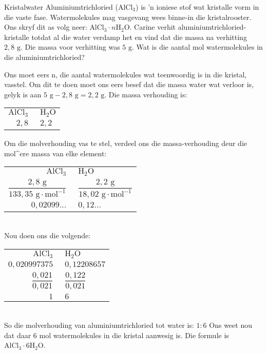     \noindent
\par
            \label{m38712*eid672431}
      \noindent
      \begin{wex}{Kristalwater}{
\label{m38712*pid47982}
\label{m38712*id64827}Aluminiumtrichloried (${\text{AlCl}}_{3}$) is 'n ioniese stof wat kristalle vorm in die vaste fase. Watermolekules mag vasgevang wees binne-in die kristalrooster. Ons skryf dit as volg neer: ${\text{AlCl}}_{3} \cdot n{\text{H}}_{2}\text{O}$. Carine verhit  aluminiumtrichloried-kristalle totdat al die water verdamp het en vind dat die massa na verhitting $2,8 \text{ g}$. Die massa voor verhitting was $5 \text{ g}$. Wat is die aantal mol watermolekules in die aluminiumtrichloried?
}
{
Ons moet eers n, die aantal watermolekules wat teenwoordig is in die kristal, vasstel. Om dit te doen moet ons eers besef dat die massa water wat verloor is, gelyk is aan $5 \text{ g} - 2,8 \text{ g} = 2,2 \text{ g}$.
  \label{m38712*id3892}Die massa verhouding is:\\
\begin{tabular}{r@{:}l}
 $\text{AlCl}_3~$ & $~\text{H}_{2}\text{O}$ \\
   $2,8~$ & $~2,2$ \\
\end{tabular}
Om die molverhouding vas te stel, verdeel ons die massa-verhouding deur die mol^{e}re massa van elke element:\\
\begin{tabular}{r@{:}l}
 $\text{AlCl}_3~$ & $~\text{H}_{2}\text{O}$ \\
    $\dfrac{2,8 \text{ g}}{133,35 \text{ g} \cdot \text{mol}^{-1}}~$ & $~\dfrac{2,2 \text{ g}}{18,02 \text{ g} \cdot \text{mol}^{-1}}$ \\
$0,02099...~$ & $~0,12...$  \\
\end{tabular}\\
Nou doen ons die volgende: \\
\begin{tabular}{r@{:}l}
 $\text{AlCl}_3~$ & $~\text{H}_{2}\text{O}$ \\
$0,020997375~$ & $~0,12208657$ \\
$\dfrac{0,021}{0,021}~$ & $~\dfrac{0,122}{0,021}$ \\
$1~$ & $~6$ \\
\end{tabular}\\
So die molverhouding van aluminiumtrichloried tot water is: $1:6$
Ons weet nou dat daar $6$ mol watermolekules in die kristal aanwesig is. Die formule is $\text{AlCl}_{3} \cdot 6\text{H}_{2}\text{O}$.
}
    \end{wex}
